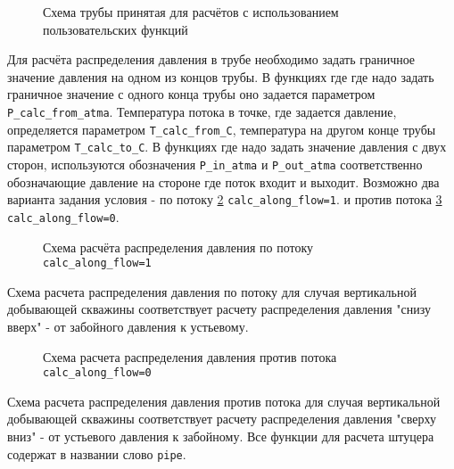 \begin{figure}[h!]
	\begin{center}
		
		\caption{Схема трубы принятая для расчётов с использованием пользовательских функций}
		\label{ris:Pipe_scheme_1}
	\end{center}
\end{figure}

Для расчёта распределения давления в трубе необходимо задать граничное значение давления на одном из концов трубы. В функциях где где надо задать граничное значение с одного конца трубы оно задается параметром  \texttt{P_calc_from_atma}. Температура потока в точке, где задается давление, определяется параметром  \texttt{T_calc_from_C}, температура на другом конце трубы  параметром \texttt{T_calc_to_C}.  В функциях где надо задать значение давления с двух сторон, используются обозначения \texttt{P_in_atma} и \texttt{P_out_atma} соответственно обозначающие давление на стороне где поток входит и выходит. 
Возможно два варианта задания условия - по потоку  \ref{ris:Pipe_scheme_2}  \texttt{calc_along_flow=1}. и против потока  \ref{ris:Pipe_scheme_3} \texttt{calc_along_flow=0}. 

\begin{figure}[h!]
	\begin{center}
				
		\caption{Схема расчёта распределения давления по потоку \texttt{calc_along_flow=1}}
		\label{ris:Pipe_scheme_2}
	\end{center}
\end{figure} 

Схема расчета распределения давления по потоку для случая вертикальной добывающей скважины соответствует расчету распределения давления "снизу вверх" - от забойного давления к устьевому.

\begin{figure}[h!]
	\begin{center}
		
		\caption{Схема расчета распределения давления против потока \texttt{calc_along_flow=0}}
		\label{ris:Pipe_scheme_3}
	\end{center}
\end{figure} 

Схема расчета распределения давления против потока для случая вертикальной добывающей скважины соответствует расчету распределения давления "сверху вниз" - от устьевого давления к забойному.
Все функции для расчета штуцера содержат в названии слово \texttt{pipe}.

